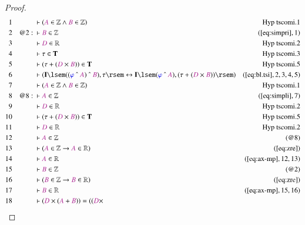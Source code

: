 \begin{proof}
\begin{align}
  1 &&  & \vdash ( \mc{A} \in \mathbb{Z} \wedge \mc{B} \in \mathbb{Z}
      )&\text{Hyp~tscomi.1}\notag%
  \\ 2 && @2:\  & \vdash \mc{B} \in \mathbb{Z}&(\mbox{\ref{eq:simpri}},1)\notag
  \\ 3 &&  & \vdash \mc{D} \in \mathbb{R}&\text{Hyp~tscomi.2}\notag%
  \\ 4 &&  & \vdash \tau \in \mathbf{T}&\text{Hyp~tscomi.3}\notag%
  \\ 5 &&  & \vdash ( \tau + ( \mc{D} \times \mc{B} ) ) \in
      \mathbf{T}&\text{Hyp~tscomi.5}\notag%
  \\ 6 &&  & \vdash ( \mathbf{I} \lsem ( ( \mw{\varphi} ~\string^~ \mc{A} )
      ~\string^~ \mc{B} ) , \tau \rsem \leftrightarrow
      \mathbf{I} \lsem ( \mw{\varphi} ~\string^~ \mc{A} ) ,
      ( \tau + ( \mc{D} \times \mc{B} ) ) \rsem
      )&(\mbox{\ref{eq:bl.tsi}},2,3,4,5)\notag
  \\ 7 &&  & \vdash ( \mc{A} \in \mathbb{Z} \wedge \mc{B} \in \mathbb{Z}
      )&\text{Hyp~tscomi.1}\notag%
  \\ 8 && @8:\  & \vdash \mc{A} \in \mathbb{Z}&(\mbox{\ref{eq:simpli}},7)\notag
  \\ 9 &&  & \vdash \mc{D} \in \mathbb{R}&\text{Hyp~tscomi.2}\notag%
  \\ 10 &&  & \vdash ( \tau + ( \mc{D} \times \mc{B} ) ) \in
      \mathbf{T}&\text{Hyp~tscomi.5}\notag%
  \\ 11 &&  & \vdash \mc{D} \in
      \mathbb{R}&\text{Hyp~tscomi.2}\notag%
  \\ 12 &&  & \vdash \mc{A} \in \mathbb{Z}&(@8)\notag
  \\ 13 &&  & \vdash ( \mc{A} \in \mathbb{Z} \rightarrow \mc{A} \in \mathbb{R}
      )&(\mbox{\ref{eq:zre}})\notag
  \\ 14 &&  & \vdash \mc{A} \in \mathbb{R}&(\mbox{\ref{eq:ax-mp}},12,13)\notag
  \\ 15 &&  & \vdash \mc{B} \in \mathbb{Z}&(@2)\notag
  \\ 16 &&  & \vdash ( \mc{B} \in \mathbb{Z} \rightarrow \mc{B} \in \mathbb{R}
      )&(\mbox{\ref{eq:zre}})\notag
  \\ 17 &&  & \vdash \mc{B} \in \mathbb{R}&(\mbox{\ref{eq:ax-mp}},15,16)\notag
  \\ 18 &&  & \vdash ( \mc{D} \times ( \mc{A} + \mc{B} ) ) = ( ( \mc{D} \times

\end{align}
\end{proof}
